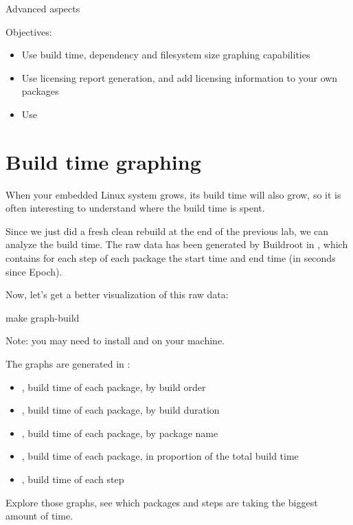 \subchapter
{Advanced aspects}
{Objectives:
  \begin{itemize}
  \item Use build time, dependency and filesystem size graphing capabilities
  \item Use licensing report generation, and add licensing
    information to your own packages
  \item Use 
  \end{itemize}
}

\section{Build time graphing}

When your embedded Linux system grows, its build time will also grow,
so it is often interesting to understand where the build time is
spent.

Since we just did a fresh clean rebuild at the end of the previous
lab, we can analyze the build time. The raw data has been generated by
Buildroot in , which contains for
each step of each package the start time and end time (in seconds
since Epoch).

Now, let's get a better visualization of this raw data:

\begin{bashinput}
make graph-build
\end{bashinput}

Note: you may need to install  and  on your machine.

The graphs are generated in :

\begin{itemize}
\item {}, build time of each package, by
  build order
\item {}, build time of each package, by
  build duration
\item {}, build time of each package, by
  package name
\item {}, build time of each package, in
  proportion of the total build time
\item {}, build time of each step
\end{itemize}

Explore those graphs, see which packages and steps are taking the
biggest amount of time.

